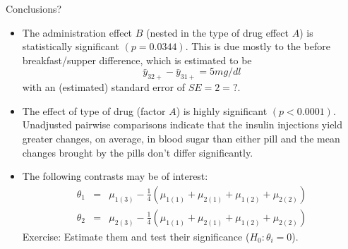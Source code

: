 \newpage
Conclusions?
\begin{itemize}
\item The administration effect $B$ (nested in the type of drug 
effect $A$) is statistically significant $(p=0.0344)$.  This is 
due mostly to the before breakfast/supper difference, which is 
estimated to be 
$$ \bar{y}_{32+} - \bar{y}_{31+} = 5 mg/dl$$
with an (estimated) standard error of $SE=2=?$.  
\item
The effect of type of drug (factor $A$) is highly significant
$(p<0.0001)$.  Unadjusted pairwise comparisons indicate that the insulin 
injections yield greater changes, on average, in blood sugar than either 
pill and the mean changes brought by the pills don't differ significantly.
\item The following contrasts may be of interest:
\begin{eqnarray*}
\theta_1 &=& \mu_{1(3)} - \frac{1}{4}(\mu_{1(1)}+\mu_{2(1)}+\mu_{1(2)}+\mu_{2(2)})\\
\theta_2 &=& \mu_{2(3)} - \frac{1}{4}(\mu_{1(1)}+\mu_{2(1)}+\mu_{1(2)}+\mu_{2(2)})
\end{eqnarray*}
Exercise: Estimate them and test their significance ($H_0: \theta_i=0$).
\end{itemize}
\bigkn


























